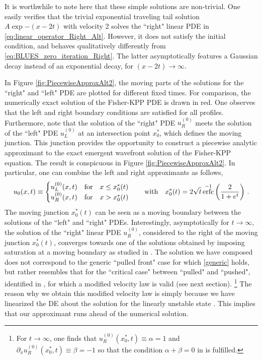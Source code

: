 \documentclass[amsmath,amssymb,amsfonts,aps,pre,preprint,superscriptaddress,showpacs,showkeys,longbibliography,nofootinbib]{revtex4-1}
\DeclareMathOperator{\erfc}{erfc}
\begin{document}
It is worthwhile to note here that these simple solutions are non-trivial. One easily verifies that the trivial exponential traveling tail solution $A \exp{-(x-2t)}$ with velocity 2 solves the ``right" linear PDE in \eqref{eq:linear_operator_Right_Alt}. However, it does not satisfy the initial condition, and behaves qualitatively differently from \eqref{eq:BLUES_zero_iteration_Right}. The latter asymptotically features a Gaussian decay instead of an exponential decay, for $(x -2t)\to \infty$.

In Figure \ref{fig:PiecewiseApproxAlt2}, the moving parts of the solutions for the ``right" and ``left" PDE are plotted for different fixed times. For comparison, the numerically exact solution of the Fisher-KPP PDE is drawn in red. One observes that the left and right boundary conditions are satisfied for all profiles. Furthermore, note that the solution of the ``right" PDE $u^{(0)}_R$ meets the solution of the ``left" PDE $u^{(0)}_L$ at an intersection point $x^*_0$, which defines the moving junction. This junction provides the opportunity to construct a piecewise analytic approximant to the exact emergent wavefront solution of the Fisher-KPP equation. The result is conspicuous in Figure \ref{fig:PiecewiseApproxAlt2}. In particular, one can combine the left and right approximants as follows,
\begin{align}\label{eq:zeroth_piecewise_approx}
    u_0(x,t)\equiv
    \begin{cases}
    u^{(0)}_{L}(x,t) \qq{for} x\leq x^*_0(t)\\
    u^{(0)}_{R}(x,t) \qq{for} x>x^*_0(t)
    \end{cases}
    \qq{with} x^*_0(t) = 2\sqrt{t}\erfc^{-1}\left(\frac{2}{1+e^{t}}\right)\,.
\end{align}
The moving junction $x^*_0(t)$ can be seen as a moving boundary between the solutions of the ``left" and ``right" PDEs. Interestingly, asymptotically for $t\to \infty$, the solution of the ``right" linear PDE $u^{(0)}_R$, considered to the right of the moving junction $x^*_0(t)$, converges towards one of the solutions obtained by imposing saturation at a moving boundary as studied in \cite{Berestycki2017}. The solution we have composed does not correspond to the generic ``pulled front" case for which \eqref{generic} holds, but rather resembles that for the ``critical case" between ``pulled" and ``pushed", identified in \cite{Ebert,Berestycki2017}, for which a modified velocity law is valid (see next section). \footnote{For $t\to \infty$, one finds that $u^{(0)}_R(x^*_0, t)\equiv \alpha=1$ and $\partial_x u^{(0)}_R(x^*_0, t)\equiv \beta=-1$ so that the condition $\alpha + \beta = 0$ in \citet{Berestycki2017} is fulfilled.} The reason why we obtain this modified velocity law is simply because we have linearized the DE about the solution for the linearly unstable state \cite{Ebert}. This implies that our approximant runs ahead of the numerical solution.
\end{document}

